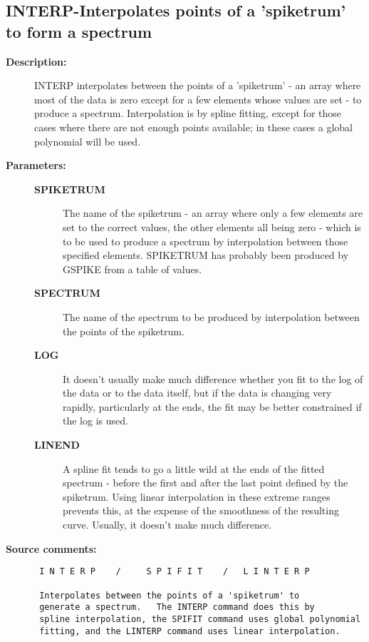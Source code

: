 \subsection{INTERP-\label{INTERP}Interpolates points of a 'spiketrum' to form a spectrum}
\begin{description}

\item [{\bf Description:}]
 INTERP interpolates between the points of a 'spiketrum' - an
 array where most of the data is zero except for a few elements
 whose values are set - to produce a spectrum.  Interpolation is
 by spline fitting, except for those cases where there are not
 enough points available; in these cases a global polynomial will
 be used.

\item [{\bf Parameters:}]
\begin{description}
\item [{\bf SPIKETRUM}]
 The name of the spiketrum - an array where
 only a few elements are set to the correct values, the
 other elements all being zero - which is to be used to
 produce a spectrum by interpolation between those specified
 elements.  SPIKETRUM has probably been produced by GSPIKE
 from a table of values.
\item [{\bf SPECTRUM}]
 The name of the spectrum to be produced by
 interpolation between the points of the spiketrum.
\item [{\bf LOG}]
 It doesn't usually make much difference whether you fit
 to the log of the data or to the data itself, but if the
 data is changing very rapidly, particularly at the ends,
 the fit may be better constrained if the log is used.
\item [{\bf LINEND}]
 A spline fit tends to go a little wild at the ends of the
 fitted spectrum - before the first and after the last point
 defined by the spiketrum.  Using linear interpolation in
 these extreme ranges prevents this, at the expense of the
 smoothness of the resulting curve.  Usually, it doesn't
 make much difference.
\end{description}

\item [{\bf Source comments:}]
\begin{verbatim}
 I N T E R P    /     S P I F I T    /   L I N T E R P

 Interpolates between the points of a 'spiketrum' to
 generate a spectrum.   The INTERP command does this by
 spline interpolation, the SPIFIT command uses global polynomial
 fitting, and the LINTERP command uses linear interpolation.


\end{verbatim}
\end{description}
